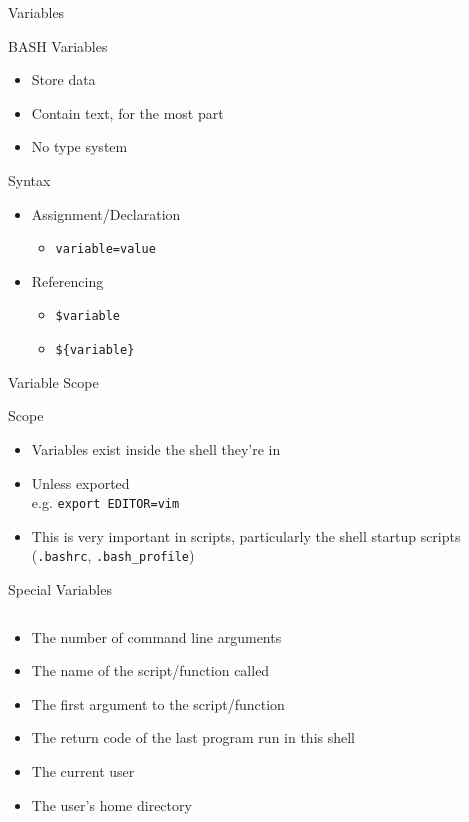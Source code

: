 \documentclass[table,dvipsnames]{beamer}
\begin{document}
\begin{frame}{Variables}
	\begin{block}{BASH Variables}
		\begin{itemize}
			\item Store data
			\item Contain text, for the most part
			\item No type system
		\end{itemize}
	\end{block}
	\begin{block}{Syntax}
		\begin{itemize}
			\item Assignment/Declaration
				\begin{itemize}
					\item \texttt{variable=value}
				\end{itemize}
			\item Referencing
				\begin{itemize}
					\item \texttt{\$variable}
					\item \texttt{\$\{variable\}}
				\end{itemize}
		\end{itemize}
	\end{block}
\end{frame}

\begin{frame}{Variable Scope}
	\begin{block}{Scope}
		\begin{itemize}
			\item Variables exist inside the shell they're in
			\item Unless exported \\
				e.g. \texttt{export EDITOR=vim}
			\item This is very important in scripts, particularly the shell
				startup scripts (\texttt{.bashrc}, \texttt{.bash\_profile})
		\end{itemize}
	\end{block}
\end{frame}

\begin{frame}{Special Variables}
	\begin{columns}
		\begin{column}[T]{0.9\textwidth}
			\begin{itemize}
				\item[\texttt{\$\#}] The number of command line arguments
				\item[\texttt{\$0}] The name of the script/function called
				\item[\texttt{\$1}] The first argument to the script/function
				\item[\texttt{\$?}] The return code of the last program run in this
					shell
				\item[\texttt{\$USER}] The current user
				\item[\texttt{\$HOME}] The user's home directory
			\end{itemize}
		\end{column}
	\end{columns}
\end{frame}
\end{document}
